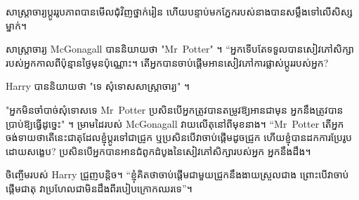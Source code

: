 សាស្ត្រាចារ្យ​ប្តូរ​រូប​ភាព​បាន​មើល​ជុំវិញ​ថ្នាក់​រៀន ហើយ​បន្ទាប់​មក​ភ្នែក​របស់​នាង​បាន​សម្លឹង​ទៅ​លើ​សិស្ស​ម្នាក់។

សាស្រ្តាចារ្យ McGonagall បាននិយាយថា "Mr~Potter" ។ “អ្នកទើបតែទទួលបានសៀវភៅសិក្សារបស់អ្នកកាលពីប៉ុន្មានថ្ងៃមុនប៉ុណ្ណោះ។ តើ​អ្នក​បាន​ចាប់​ផ្តើ​ម​អាន​សៀវភៅ​ការ​ផ្លាស់​ប្តូ​រ​របស់​អ្នក​?

Harry បាននិយាយថា "ទេ សុំទោសសាស្រ្តាចារ្យ" ។

"អ្នកមិនចាំបាច់សុំទោសទេ Mr~Potter ប្រសិនបើអ្នកត្រូវបានតម្រូវឱ្យអានជាមុន អ្នកនឹងត្រូវបានប្រាប់ឱ្យធ្វើដូច្នេះ" ។ ម្រាមដៃរបស់ McGonagall វាយលើតុនៅពីមុខនាង។ “Mr~Potter តើអ្នកចង់ទាយថាតើនេះជាតុដែលខ្ញុំប្តូរទៅជាជ្រូក ឬប្រសិនបើវាចាប់ផ្តើមដូចជ្រូក ហើយខ្ញុំបានដកការប្រែរូបដោយសង្ខេប? ប្រសិនបើអ្នកបានអានជំពូកដំបូងនៃសៀវភៅសិក្សារបស់អ្នក អ្នកនឹងដឹង។

ចិញ្ចើមរបស់ Harry ជ្រួញបន្តិច។ “ខ្ញុំ​គិត​ថា​ចាប់​ផ្តើម​ជាមួយ​ជ្រូក​នឹង​ងាយ​ស្រួល​ជាង ព្រោះ​បើ​វា​ចាប់​ផ្តើម​ជា​តុ វា​ប្រហែល​ជា​មិន​ដឹង​ពី​របៀប​ក្រោក​ឈរ​ទេ”។

